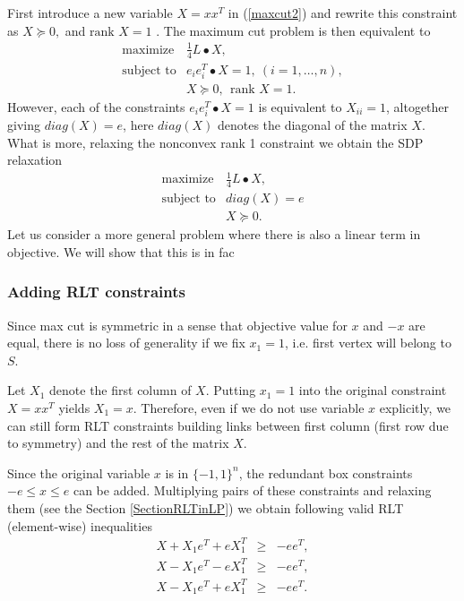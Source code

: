\documentclass[12pt]{book}
\theoremstyle{definition}
\begin{document}
First introduce a new variable $X = xx^T$ in (\ref{maxcut2})  and rewrite this constraint as $X\succeq 0,$ and $\mbox{rank }X = 1$ . The maximum cut problem is then equivalent to 
\begin{equation}
\label{maxcutstandardSDPstep1}
\begin{array}{ll}
\mbox{maximize} & \frac{1}{4}L\bullet X, \\
\mbox{subject to} & e_ie_i^T\bullet X = 1, \ (i = 1,\dots ,n), \\
				&	X\succeq 0, \ \ \mbox{rank }X = 1.
\end{array}
\end{equation}
However, each of the constraints $e_ie_i^T\bullet X = 1$ is equivalent to $X_{ii} = 1$, altogether giving $diag(X) = e$, here $diag(X)$ denotes the diagonal of the matrix $X$.
What is more, relaxing the nonconvex rank 1 constraint we obtain the SDP relaxation 
\begin{equation}
\label{MaxCutSDPRelax}
\begin{array}{ll}
\mbox{maximize} & \frac{1}{4}L\bullet X, \\
\mbox{subject to} & diag(X) = e \\
&	X\succeq 0.
\end{array}
\end{equation} 
Let us consider a more general problem where there is also a linear term in objective. We will show that this is in fac

\subsubsection{Adding RLT constraints}
Since max cut is symmetric in a sense that objective value for $x$ and $-x$ are equal, there is no loss of generality if we fix $x_1 = 1$, i.e. first vertex will belong to $S$. 

Let $X_1$ denote the first column of $X$. Putting $x_1 = 1$ into the original constraint $X = xx^T$ yields $X_1 = x$.
Therefore, even if we do not use variable $x$ explicitly, we can still form RLT constraints building links between first column (first row due to symmetry) and the rest of the matrix $X$.

Since the original variable $x$ is in $\{-1,1\}^n$, the redundant box constraints $-e\leq x\leq e$ can be added. Multiplying pairs of these constraints and relaxing them (see the Section \ref{SectionRLTinLP}) we obtain following valid RLT (element-wise) inequalities
\begin{equation}
\label{MaxCutRLTInequalities}
\begin{array}{lcl}
		 X + X_1e^T + eX_1^T & \geq & -ee^T, \\
		 X - X_1e^T - eX_1^T & \geq & -ee^T, \\
		 X - X_1e^T + eX_1^T & \geq & -ee^T.
\end{array}
\end{equation}
\end{document}
